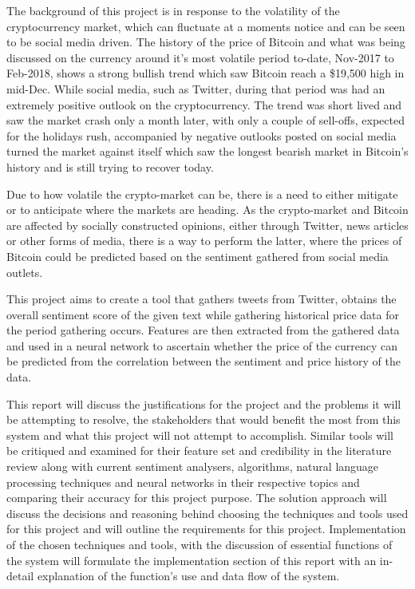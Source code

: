 \documentclass[oneside, 12pt]{article}
\begin{document}
	The background of this project is in response to the volatility of the cryptocurrency market, which can fluctuate at a moments notice and can be seen to be social media driven. The history of the price of Bitcoin and what was being discussed on the currency around it's most volatile period to-date, Nov-2017 to Feb-2018, shows a strong bullish trend which saw Bitcoin reach a \$19,500 high in mid-Dec. While social media, such as Twitter, during that period was had an extremely positive outlook on the cryptocurrency. The trend was short lived and saw the market crash only a month later, with only a couple of sell-offs, expected for the holidays rush, accompanied by negative outlooks posted on social media turned the market against itself which saw the longest bearish market in Bitcoin's history and is still trying to recover today.
	
	Due to how volatile the crypto-market can be, there is a need to either mitigate or to anticipate where the markets are heading. As the crypto-market and Bitcoin are affected by socially constructed opinions, either through Twitter, news articles or other forms of media, there is a way to perform the latter, where the prices of Bitcoin could be predicted based on the sentiment gathered from social media outlets.
	
	This project aims to create a tool that gathers tweets from Twitter, obtains the overall sentiment score of the given text while gathering historical price data for the period gathering occurs. Features are then extracted from the gathered data and used in a neural network to ascertain whether the price of the currency can be predicted from the correlation between the sentiment and price history of the data.
	
	This report will discuss the justifications for the project and the problems it will be attempting to resolve, the stakeholders that would benefit the most from this system and what this project will not attempt to accomplish. Similar tools will be critiqued and examined for their feature set and credibility in the literature review along with current sentiment analysers, algorithms, natural language processing techniques and neural networks in their respective topics and comparing their accuracy for this project purpose. 
	The solution approach will discuss the decisions and reasoning behind choosing the techniques and tools used for this project and will outline the requirements for this project.
	Implementation of the chosen techniques and tools, with the discussion of essential functions of the system will formulate the implementation section of this report with an in-detail explanation of the function's use and data flow of the system.
	
\end{document}
